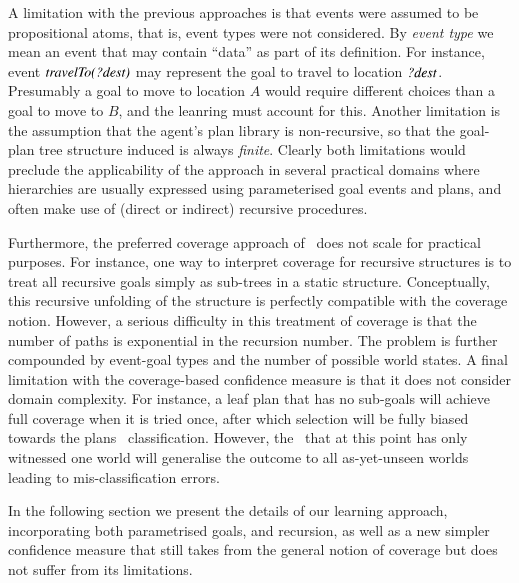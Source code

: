 A limitation with the previous approaches is that 
events were assumed to be propositional atoms, that is, event
types were not considered. By \emph{event type} we mean an event that may
contain ``data'' as part of its definition. For instance, event
${\mbox{\textit{travelTo(?dest)}}}$ may represent the goal to travel to location
${\mbox{\textit{?dest}}}$. Presumably a goal to move to location $A$ would 
require different choices than a goal to move to $B$, and the leanring
must account for this.
Another limitation is the assumption that the agent's plan library is
non-recursive, so that the goal-plan tree structure induced is always
\emph{finite}.
Clearly both limitations would preclude the applicability of the approach in
several practical domains where hierarchies are usually expressed
using parameterised goal events and plans, and often make
use of (direct or indirect) recursive procedures.


Furthermore, the preferred coverage approach of~\cite{Singh:AAMAS10} does not scale for practical purposes. For instance, one way to interpret coverage for recursive structures is to treat all recursive goals simply as sub-trees in a static structure. Conceptually, this recursive unfolding of the structure is perfectly compatible with the coverage notion. However, a serious difficulty in this treatment of coverage is that the number of paths is exponential in the recursion number. The problem is further compounded by event-goal types and the number of possible world states. A final limitation with the coverage-based confidence measure is that it does not consider domain complexity. For instance, a leaf plan that has no sub-goals will achieve full coverage when it is tried once, after which selection will be fully biased towards the plans \dt\ classification. However, the \dt\ that at this point has only witnessed one world will generalise the outcome to all as-yet-unseen worlds leading to mis-classification errors.

In the following section we present the details of our learning
approach, incorporating both parametrised goals, and recursion, as
well as a new simpler confidence measure that still takes from the 
general notion of coverage but does not suffer from its limitations.







